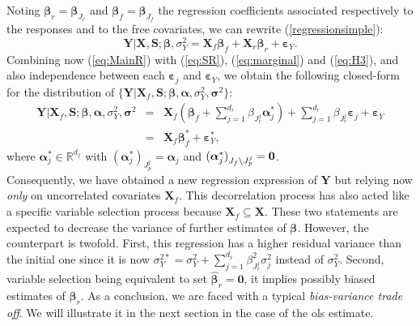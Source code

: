 \documentclass[11pt,a4paper]{article}
\begin{document}
Noting $\boldsymbol{\beta}_r=\boldsymbol{\beta}_{J_r}$ and $\boldsymbol{\beta}_f=\boldsymbol{\beta}_{J_f}$ the regression coefficients associated respectively to the responses and to the free covariates, we can rewrite (\ref{regressionsimple}):
\begin{equation}
			\boldsymbol{Y}{|\boldsymbol{X},\boldsymbol{S}};\boldsymbol{\beta},\sigma_Y^2=\boldsymbol{X}_f\boldsymbol{\beta}_f+\boldsymbol{X}_r\boldsymbol{\beta}_r+\boldsymbol{\varepsilon}_Y. \label{eq:MainR}
\end{equation}
Combining now (\ref{eq:MainR}) with (\ref{eq:SR}), (\ref{eq:marginal}) and (\ref{eq:H3}), and also independence between each $\boldsymbol{\varepsilon}_j$ and $\boldsymbol{\varepsilon}_Y$, we obtain the following closed-form for the distribution of $\{\boldsymbol{Y} |\boldsymbol{X}_f,\boldsymbol{S};\boldsymbol{\beta},\boldsymbol{\alpha},\sigma_Y^2,\boldsymbol{\sigma}^2\}$:
\begin{eqnarray}
	\boldsymbol{Y}{|\boldsymbol{X}_f,\boldsymbol{S}};\boldsymbol{\beta},\boldsymbol{\alpha},\sigma_Y^2,\boldsymbol{\sigma}^2&=&\boldsymbol{X}_f (\boldsymbol{\beta}_f+ \sum_{j =1}^{d_r}\beta_{J_r^j}\boldsymbol{\alpha}_j^*)+  \sum_{j =1}^{d_r}\beta_{J_r^j}\boldsymbol{\varepsilon}_j+\boldsymbol{\varepsilon}_Y \label{eq:Trueexpl} \\
	&=&\boldsymbol{X}_f\boldsymbol{\beta}_f^*+\boldsymbol{\varepsilon}_Y^*,\label{eq:modexpl}
\end{eqnarray}
where $\boldsymbol{\alpha}^*_j \in \mathbb{R}^{d_f}$ with $(\boldsymbol{\alpha}_j^*)_{J_p^j}=\boldsymbol{\alpha}_j $ and $(\boldsymbol{\alpha}_j^*)_{J_f\setminus J_p^j}=\bf 0  $. \\
Consequently, we have obtained a new regression expression of $\boldsymbol{Y}$ but relying now {\it only} on uncorrelated covariates $\boldsymbol{X}_f$. This decorrelation process has also acted like a specific variable selection process because $\boldsymbol{X}_f \subseteq \boldsymbol{X}$. These two statements are expected to decrease the variance of further estimates of $\boldsymbol{\beta}$. However, the counterpart is twofold. First, this regression has a higher residual variance than the initial one since it is now $\sigma^{2*}_Y=\sigma^2_Y+\sum_{j =1}^{d_r}\beta_{J_r^j}^2\sigma^2_j$ instead of $\sigma^2_Y$. Second, variable selection being equivalent to set $\hat{\boldsymbol{\beta}}_r=\boldsymbol{0}$, it implies possibly biased estimates of $\boldsymbol{\beta}_r$. As a conclusion, we are faced with a typical {\it bias-variance trade off}. We will illustrate it in the next section in the case of the {\sc ols} estimate.
\end{document}
